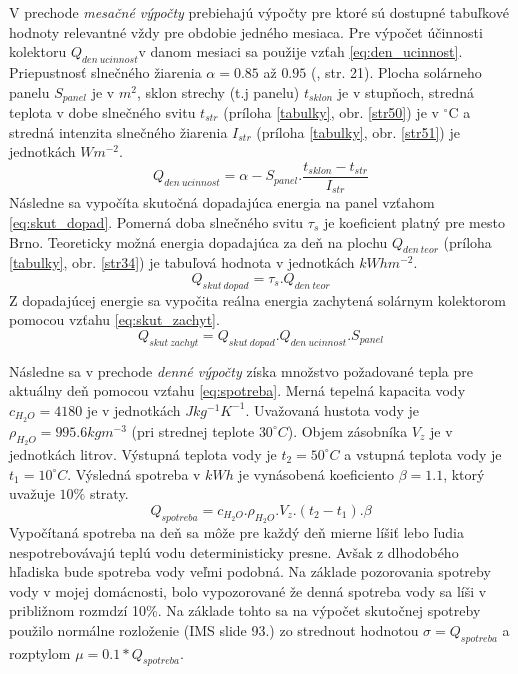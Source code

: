 \documentclass[a4paper, 11pt]{article}
\begin{document}
V prechode \textit{mesačné výpočty} prebiehajú výpočty pre ktoré sú dostupné tabuľkové hodnoty relevantné vždy pre obdobie jedného mesiaca. Pre výpočet účinnosti kolektoru  $Q_{den\ ucinnost}$v danom mesiaci sa použije vzťah \ref{eq:den_ucinnost}. Priepustnosť slnečného žiarenia $\alpha=0.85$ až $0.95$ (\cite{bc_solar_system}, str. 21). Plocha solárneho panelu $S_{panel}$ je v $m^2$, sklon strechy (t.j panelu) $t_{sklon}$ je v stupňoch, stredná teplota v dobe slnečného svitu $t_{str}$ (príloha \ref{tabulky}, obr. \ref{str50}) je v $^{\circ}$C a stredná intenzita slnečného žiarenia $I_{str}$ (príloha \ref{tabulky}, obr. \ref{str51}) je jednotkách $Wm^{-2}$.
\begin{equation}\label{eq:den_ucinnost}
Q_{den\ ucinnost} = \alpha - S_{panel} . \frac{t_{sklon} - t_{str}}{I_{str}}
\end{equation}
Následne sa vypočíta skutočná dopadajúca energia na panel vzťahom \ref{eq:skut_dopad}. Pomerná doba slnečného svitu $\tau_s$ je koeficient platný pre mesto Brno. Teoreticky možná energia dopadajúca za deň na plochu $Q_{den\ teor}$ (príloha \ref{tabulky}, obr. \ref{str34}) je tabuľová hodnota v jednotkách $kWhm^{-2}$.
\begin{equation}\label{eq:skut_dopad}
Q_{skut\ dopad} = \tau_s . Q_{den\ teor}
\end{equation}
Z dopadajúcej energie sa vypočita reálna energia zachytená solárnym kolektorom pomocou vzťahu \ref{eq:skut_zachyt}.
\begin{equation}\label{eq:skut_zachyt}
Q_{skut\ zachyt} = Q_{skut\ dopad} . Q_{den\ ucinnost} . S_{panel}
\end{equation}

Následne sa v prechode \textit{denné výpočty} získa množstvo požadované tepla pre aktuálny deň pomocou vzťahu \ref{eq:spotreba}. Merná tepelná kapacita vody $c_{H_2O}=4180$ je v jednotkách $Jkg^{-1}K^{-1}$. Uvažovaná hustota vody je $\rho_{H_2O} = 995.6kgm^{-3}$ (pri strednej teplote $30^{\circ}C$). Objem zásobníka $V_z$ je v jednotkách litrov. Výstupná teplota vody je $t_2 = 50^{\circ}C$ a vstupná teplota vody je $t_1 = 10^{\circ}C$. Výsledná spotreba v $kWh$ je vynásobená koeficiento $\beta = 1.1$, ktorý uvažuje $10\%$ straty.
\begin{equation}\label{eq:spotreba}
Q_{spotreba} = c_{H_2O} . \rho_{H_2O} . V_z . (t_2 - t_1) . \beta
\end{equation}
Vypočítaná spotreba na deň sa môže pre každý deň mierne líšiť lebo ľudia nespotrebovávajú teplú vodu deterministicky presne. Avšak z dlhodobého hľadiska bude spotreba vody veľmi podobná. Na základe pozorovania spotreby vody v mojej domácnosti, bolo vypozorované že denná spotreba vody sa líši v približnom rozmdzí 10\%. Na základe tohto sa na výpočet skutočnej spotreby použilo normálne rozloženie (IMS\cite{ims_slides} slide 93.) zo strednout hodnotou $\sigma=Q_{spotreba}$ a rozptylom $\mu=0.1*Q_{spotreba}$.
\end{document}
